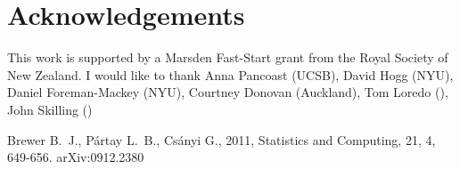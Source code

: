 \documentclass[letterpaper, 11pt]{article}
\begin{document}
\section*{Acknowledgements}
This work is supported by a Marsden Fast-Start grant
from the Royal Society of New Zealand. I would like to thank
Anna Pancoast (UCSB), David Hogg (NYU), Daniel Foreman-Mackey (NYU),
Courtney Donovan (Auckland), Tom Loredo (), John Skilling ()


\begin{thebibliography}{}
 Brewer B.~J., P{\'a}rtay L.~B., Cs{\'a}nyi G., 2011,
Statistics and Computing, 21, 4, 649-656. arXiv:0912.2380

\end{thebibliography}
\end{document}

